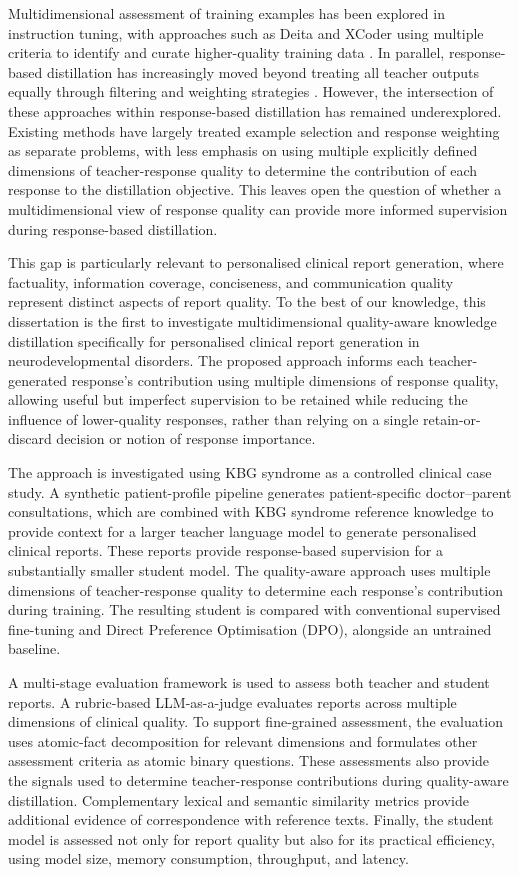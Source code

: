 \documentclass[ %
                    author={Aman Kumar Singh},
                supervisor={Dr. Edwin Simpson},
                    degree={MSc},
                     title={Quality-Aware Knowledge Distillation of Large Language Models for Efficient Personalised Clinical Report Generation},
                  subtitle={},
                      type={},
                      year={2021}]{dissertation}
\begin{document}
Multidimensional assessment of training examples has been explored in
instruction tuning, with approaches such as Deita and XCoder using multiple
criteria to identify and curate higher-quality training data
\cite{liu_what_2024,wang_how_2024}. In parallel, response-based distillation
has increasingly moved beyond treating all teacher outputs equally through
filtering and weighting strategies
\cite{liu_air_2025-1,lei_learning_2025,lee_what_2026}. However, the
intersection of these approaches within response-based distillation has
remained underexplored. Existing methods have largely
treated example selection and response weighting as separate problems, with
less emphasis on using multiple explicitly defined dimensions of
teacher-response quality to determine the contribution of each response to
the distillation objective. This leaves open the question of whether a multidimensional view of response quality can provide more informed supervision during response-based distillation.

This gap is particularly relevant to personalised clinical report generation,
where factuality, information coverage, conciseness, and communication quality
represent distinct aspects of report quality. To the best of our knowledge,
this dissertation is the first to investigate multidimensional quality-aware
knowledge distillation specifically for personalised clinical report
generation in
neurodevelopmental disorders. The proposed approach informs each teacher-generated response's
contribution using multiple dimensions of response quality, allowing useful
but imperfect supervision to be retained while reducing the influence of
lower-quality responses, rather than relying on a single retain-or-discard
decision or notion of response importance.

The approach is investigated using KBG syndrome as a controlled clinical case
study. A synthetic patient-profile pipeline generates patient-specific
doctor--parent consultations, which are combined with KBG syndrome reference
knowledge to provide context for a larger teacher language model to generate
personalised clinical reports. These reports provide response-based
supervision for a substantially smaller student model. The quality-aware
approach uses multiple dimensions of teacher-response quality to determine
each response's contribution during training. The resulting student is
compared with conventional supervised fine-tuning and Direct Preference
Optimisation (DPO), alongside an untrained baseline.

A multi-stage evaluation framework is used to assess both teacher and student reports. A rubric-based LLM-as-a-judge evaluates reports across multiple dimensions of clinical quality. To support fine-grained assessment, the evaluation uses atomic-fact decomposition for relevant dimensions and formulates other assessment criteria as atomic binary questions. These assessments also provide the signals used to determine teacher-response contributions during quality-aware distillation. Complementary lexical and semantic similarity metrics provide additional evidence of correspondence with reference texts. Finally, the student model is assessed not only for report quality but also for its practical efficiency, using model size, memory consumption, throughput, and latency.
\end{document}
